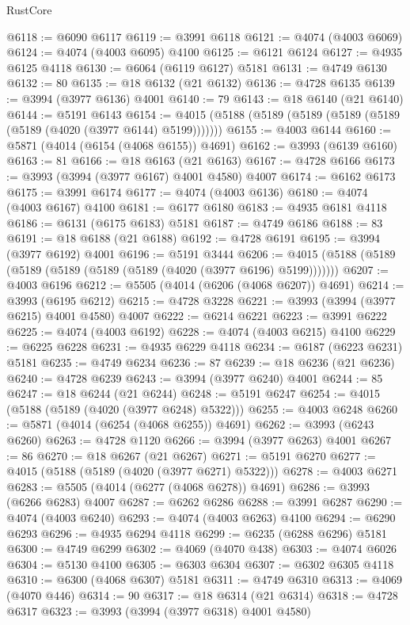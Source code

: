 \begin{lexlean}{RustCore}
\begin{coremodule}
@6118 := @6090 @6117
@6119 := @3991 @6118
@6121 := @4074 (@4003 @6069)
@6124 := @4074 (@4003 @6095) @4100
@6125 := @6121 @6124
@6127 := @4935 @6125 @4118
@6130 := @6064 (@6119 @6127) @5181
@6131 := @4749 @6130
@6132 := 80
@6135 := @18 @6132 (@21 @6132)
@6136 := @4728 @6135
@6139 := @3994 (@3977 @6136) @4001
@6140 := 79
@6143 := @18 @6140 (@21 @6140)
@6144 := @5191 @6143
@6154 := @4015 (@5188 (@5189 (@5189 (@5189 (@5189 (@5189 (@4020 (@3977 @6144) @5199)))))))
@6155 := @4003 @6144
@6160 := @5871 (@4014 (@6154 (@4068 @6155)) @4691)
@6162 := @3993 (@6139 @6160)
@6163 := 81
@6166 := @18 @6163 (@21 @6163)
@6167 := @4728 @6166
@6173 := @3993 (@3994 (@3977 @6167) @4001 @4580) @4007
@6174 := @6162 @6173
@6175 := @3991 @6174
@6177 := @4074 (@4003 @6136)
@6180 := @4074 (@4003 @6167) @4100
@6181 := @6177 @6180
@6183 := @4935 @6181 @4118
@6186 := @6131 (@6175 @6183) @5181
@6187 := @4749 @6186
@6188 := 83
@6191 := @18 @6188 (@21 @6188)
@6192 := @4728 @6191
@6195 := @3994 (@3977 @6192) @4001
@6196 := @5191 @3444
@6206 := @4015 (@5188 (@5189 (@5189 (@5189 (@5189 (@5189 (@4020 (@3977 @6196) @5199)))))))
@6207 := @4003 @6196
@6212 := @5505 (@4014 (@6206 (@4068 @6207)) @4691)
@6214 := @3993 (@6195 @6212)
@6215 := @4728 @3228
@6221 := @3993 (@3994 (@3977 @6215) @4001 @4580) @4007
@6222 := @6214 @6221
@6223 := @3991 @6222
@6225 := @4074 (@4003 @6192)
@6228 := @4074 (@4003 @6215) @4100
@6229 := @6225 @6228
@6231 := @4935 @6229 @4118
@6234 := @6187 (@6223 @6231) @5181
@6235 := @4749 @6234
@6236 := 87
@6239 := @18 @6236 (@21 @6236)
@6240 := @4728 @6239
@6243 := @3994 (@3977 @6240) @4001
@6244 := 85
@6247 := @18 @6244 (@21 @6244)
@6248 := @5191 @6247
@6254 := @4015 (@5188 (@5189 (@4020 (@3977 @6248) @5322)))
@6255 := @4003 @6248
@6260 := @5871 (@4014 (@6254 (@4068 @6255)) @4691)
@6262 := @3993 (@6243 @6260)
@6263 := @4728 @1120
@6266 := @3994 (@3977 @6263) @4001
@6267 := 86
@6270 := @18 @6267 (@21 @6267)
@6271 := @5191 @6270
@6277 := @4015 (@5188 (@5189 (@4020 (@3977 @6271) @5322)))
@6278 := @4003 @6271
@6283 := @5505 (@4014 (@6277 (@4068 @6278)) @4691)
@6286 := @3993 (@6266 @6283) @4007
@6287 := @6262 @6286
@6288 := @3991 @6287
@6290 := @4074 (@4003 @6240)
@6293 := @4074 (@4003 @6263) @4100
@6294 := @6290 @6293
@6296 := @4935 @6294 @4118
@6299 := @6235 (@6288 @6296) @5181
@6300 := @4749 @6299
@6302 := @4069 (@4070 @438)
@6303 := @4074 @6026
@6304 := @5130 @4100
@6305 := @6303 @6304
@6307 := @6302 @6305 @4118
@6310 := @6300 (@4068 @6307) @5181
@6311 := @4749 @6310
@6313 := @4069 (@4070 @446)
@6314 := 90
@6317 := @18 @6314 (@21 @6314)
@6318 := @4728 @6317
@6323 := @3993 (@3994 (@3977 @6318) @4001 @4580)

\end{coremodule}
\end{lexlean}
